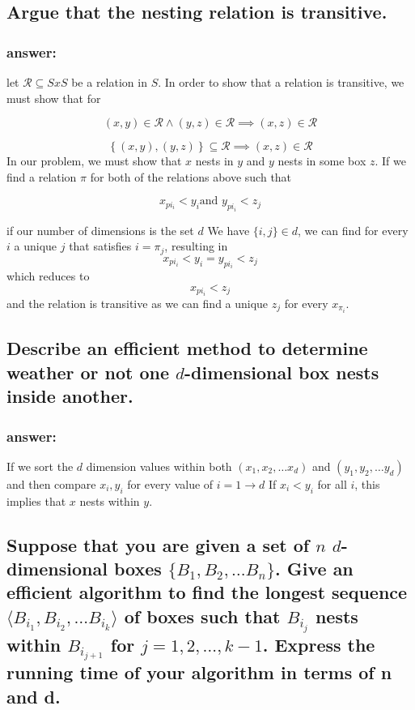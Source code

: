 \documentclass[titlepage]{article}
\theoremstyle{definition}
\begin{document}
  \subsection{Argue that the nesting relation is transitive.}
    \subsubsection{answer:}
      let $\mathcal R \subseteq S x S$ be a relation in $S$. 
      In order to show that a relation is transitive, we must show that  for

      \[ \left({x, y}\right) \in \mathcal R \land \left({y, z}\right) \in \mathcal R \implies \left({x, z}\right) \in \mathcal R \]

      \[ \left\{ {\left({x, y}\right), \left({y, z}\right)}\right\} \subseteq \mathcal R \implies \left({x, z}\right) \in \mathcal R \]
      In our problem, we must show that $x$ nests in $y$ and $y$ nests in some box
      $z$. If we find a relation $\pi$ for both of the relations above such that

      \[ x_{pi_i} < y_i \text{and } y_{pi_i} < z_j \]

      if our number of dimensions is the set $d$
      We have $ \{i,j\} \in d$, we can find for every $i$ a unique $j$ that satisfies
      $i = \pi_j$, resulting in 
      \[ x_{pi_i} < y_i =  y_{pi_i} < z_j \]
      which reduces to 
      \[ x_{pi_i} < z_j \]
      and the relation is transitive as we can find a unique $z_j$ for every
      $x_{\pi_i}$.



  \subsection{Describe an efficient method to determine weather or not one
              $d$-dimensional box nests inside another.}
  \subsubsection{answer:}
    If we sort the $d$ dimension values within both $(x_1, x_2, \dots x_d)$ and
    $(y_1, y_2, \dots y_d)$ and then compare $x_i, y_i$ for every value of $i =
    1 \to d$ If $x_i <y_i$ for all $i$, this implies that $x$ nests within $y$.
    
  \subsection{Suppose that you are given a set of $n$ $d$-dimensional boxes
        $\{B_1, B_2,\dots B_n\}$. Give an efficient algorithm to find the longest
        sequence $\langle B_{i_1}, B_{i_2},\dots B_{i_k}\rangle$ of boxes such that
        $B_{i_j}$ nests within  $B_{i_{j+1}}$ for $j = 1,2,\dots,k-1$. Express the
        running time of your algorithm in terms of n and d.}
\end{document}
